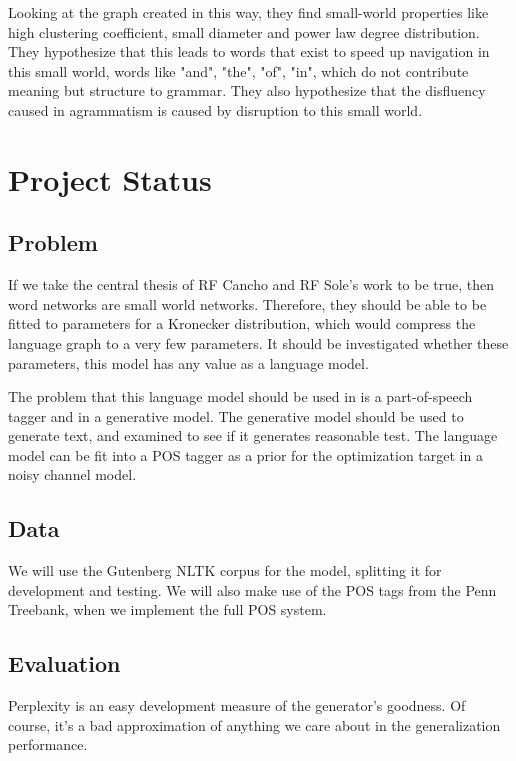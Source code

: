 \documentclass[12pt]{article}
\begin{document}
Looking at the graph created in this way, they find small-world properties like high clustering coefficient, small diameter and power law degree distribution. They hypothesize that this leads to words that exist to speed up navigation in this small world, words like "and", "the", "of", "in", which do not contribute meaning but structure to grammar. They also hypothesize that the disfluency caused in agrammatism is caused by disruption to this small world.

\section{Project Status}

\subsection{Problem}

If we take the central thesis of RF Cancho and RF Sole's work to be true, then word networks are small world networks. Therefore, they should be able to be fitted to parameters for a Kronecker distribution, which would compress the language graph to a very few parameters. It should be investigated whether these parameters, this model has any value as a language model.

The problem that this language model should be used in is a part-of-speech tagger and in a generative model. The generative model should be used to generate text, and examined to see if it generates reasonable test. The language model can be fit into a POS tagger as a prior for the optimization target in a noisy channel model.%

\subsection{Data}
We will use the Gutenberg NLTK corpus for the model, splitting it for development and testing. We will also make use of the POS tags from the Penn Treebank, when we implement the full POS system.

\subsection{Evaluation}
Perplexity is an easy development measure of the generator's goodness. Of course, it's a bad approximation of anything we care about in the generalization performance. %
\end{document}
